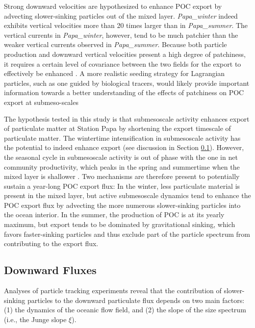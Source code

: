 \documentclass[article,linenumbers]{agujournal2018}
\begin{document}
	Strong downward velocities are hypothesized to enhance POC export by advecting slower-sinking particles out of the mixed layer. \textit{Papa\_winter} indeed exhibits vertical velocities more than 20 times larger than in \textit{Papa\_summer}. The vertical currents in \textit{Papa\_winter}, however, tend to be much patchier than the weaker vertical currents observed in \textit{Papa\_summer}. Because both particle production and downward vertical velocities present a high degree of patchiness, it requires a certain level of covariance between the two fields for the export to effectively be enhanced \citep{Mahadevan_2012}. A more realistic seeding strategy for Lagrangian particles, such as one guided by biological tracers, would likely provide important information towards a better understanding of the effects of patchiness on POC export at submeso-scales
	
	The hypothesis tested in this study is that submesoscale activity enhances export of particulate matter at Station Papa by shortening the export timescale of particulate matter. The wintertime intensification in submesoscale activity has the potential to indeed enhance export (see discussion in Section \ref{sec: discussion_particle}). However, the seasonal cycle in submesoscale activity is out of phase with the one in net community productivity, which peaks in the spring and summertime when the mixed layer is shallower \citep{Plant_2016}. Two mechanisms are therefore present to potentially sustain a year-long POC export flux: In the winter, less particulate material is present in the mixed layer, but active submesoscale dynamics tend to enhance the POC export flux by advecting the more numerous slower-sinking particles into the ocean interior. In the summer, the production of POC is at its yearly maximum, but export tends to be dominated by gravitational sinking, which favors faster-sinking particles and thus exclude part of the particle spectrum from contributing to the export flux.
	
	\subsection{Downward Fluxes}
	\label{sec: discussion_particle}
	
	Analyses of particle tracking experiments reveal that the contribution of slower-sinking particles to the downward particulate flux depends on two main factors: (1) the dynamics of the oceanic flow field, and (2) the slope of the size spectrum (i.e., the Junge slope $\xi$).
	
\end{document}
